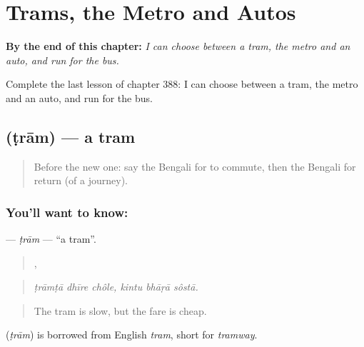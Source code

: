 
\chapter{Trams, the Metro and Autos}
\label{ch:bn-trams-the-metro-and-autos}

\begin{chapteropening}
\textbf{By the end of this chapter:} \emph{I can choose between a tram, the metro and an auto, and run for the bus.}

Complete the last lesson of chapter 388: I can choose between a tram, the metro and an auto, and run for the bus.
\end{chapteropening}

\section[\texorpdfstring{\bn{ট্রাম} (ṭrām)}{ট্রাম (ṭrām)}]{ (ṭrām) — a tram}

\label{lesson:BN-C388-tram}



\begin{quote}
Before the new one: say the Bengali for to commute, then the Bengali for return (of a journey).
\end{quote}

\subsection*{You'll want to know: }
\textbf{} — \emph{ṭrām} — \textquotedblleft{}a tram\textquotedblright{}.

\begin{quote}
  ,   
\end{quote}

\begin{quote}
\emph{ṭrāmṭā dhīre chôle, kintu bhāṛā sôstā.}
\end{quote}

\begin{quote}
The tram is slow, but the fare is cheap.
\end{quote}

\begin{cousinweb}
\textbf{} (\emph{ṭrām}) is borrowed from English \emph{tram}, short for \emph{tramway}.
\end{cousinweb}

